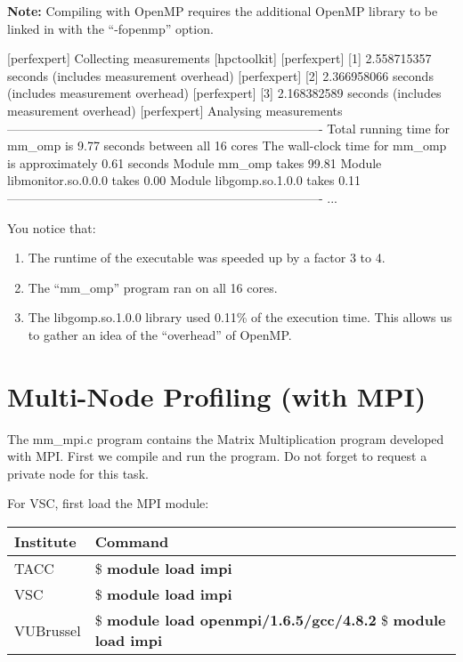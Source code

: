 \textbf{Note:} Compiling with OpenMP requires the additional OpenMP library to be linked in with the ``-fopenmp'' option.

\begin{prompt}
[perfexpert] Collecting measurements [hpctoolkit]
[perfexpert]    [1] 2.558715357 seconds (includes measurement overhead)
[perfexpert]    [2] 2.366958066 seconds (includes measurement overhead)
[perfexpert]    [3] 2.168382589 seconds (includes measurement overhead)
[perfexpert] Analysing measurements
----------------------------------------------------------------------------
Total running time for mm_omp is 9.77 seconds between all 16 cores
The wall-clock time for mm_omp is approximately 0.61 seconds
Module mm_omp takes 99.81%
Module libmonitor.so.0.0.0 takes 0.00%
Module libgomp.so.1.0.0 takes 0.11%
----------------------------------------------------------------------------
...
\end{prompt}

You notice that:
\begin{enumerate}
  \item  The runtime of the executable was speeded up by a factor 3 to 4.
  \item  The ``mm\_omp'' program ran on all 16 cores.
  \item  The libgomp.so.1.0.0 library used 0.11\% of the execution time. This allows us to gather an idea of the ``overhead'' of OpenMP.
\end{enumerate}

\section{Multi-Node Profiling (with MPI)}
\label{sec:Multi_node_profiling_MPI}

The mm\_mpi.c program contains the Matrix Multiplication program developed with MPI. First we compile and run the program. Do not forget to request a private node for this task.

For VSC, first load the MPI module:

\begin{prompt}
\end{prompt}

\begin{tabular}{|p{}|p{}} \hline
\textbf{Institute}          & \textbf{Command} \\ \hline
TACC                        & \$ \textbf{module load impi} \\ \hline
VSC                         & \$ \textbf{module load impi} \\ \hline
VUBrussel                   & \$ \textbf{module load openmpi/1.6.5/gcc/4.8.2}
                              \$ \textbf{module load impi} \\ \hline
\end{tabular}


